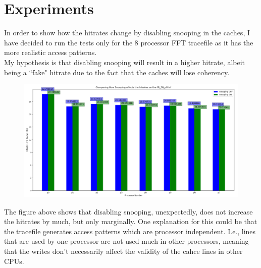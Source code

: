 \documentclass[]{article}
\begin{document}
\section{Experiments}

In order to show how the hitrates change by disabling snooping in the caches, I have decided to run the tests only for the 8 processor FFT tracefile as it has the more realistic access patterns.\\
My hypothesis is that disabling snooping will result in a higher hitrate, albeit being a ``fake" hitrate due to the fact that the caches will lose coherency.

\begin{figure}[H]
	\includegraphics[scale=0.35,left]{./snoop.png}
\end{figure}


The figure above shows that disabling snooping, unexpectedly, does not increase the hitrates by much, but only marginally. One explanation for this could be that the tracefile generates access patterns which are processor independent. I.e., lines that are used by one processor are not used much in other processors, meaning that the writes don't necessarily affect the validity of the cahce lines in other CPUs.
\end{document}
